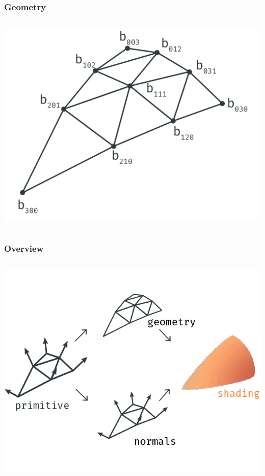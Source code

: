 	\begin{frame}\frametitle{Geometry}
		\begin{columns}
			\begin{column}{0.6\textwidth}
				\begin{center}
				\includegraphics[width=\textwidth]{img/1_single/geometry_4.png}
				\end{center}	
			\end{column}
		\end{columns}
	\end{frame}

	\begin{frame}\frametitle{Overview}
		\begin{columns}
			\begin{column}{0.9\textwidth}
				\begin{center}
					\includegraphics[width=\textwidth]{./img/1_single/recap_result.png}
				\end{center}		
			\end{column}
		\end{columns}
	\end{frame}	

